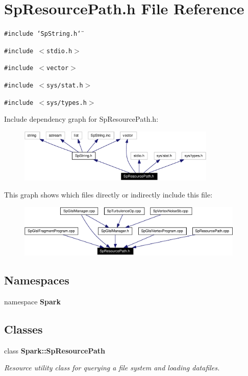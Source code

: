 \section{Sp\-Resource\-Path.h File Reference}
\label{SpResourcePath_8h}
{\tt \#include \char`\"{}Sp\-String.h\char`\"{}}\par
{\tt \#include $<$stdio.h$>$}\par
{\tt \#include $<$vector$>$}\par
{\tt \#include $<$sys/stat.h$>$}\par
{\tt \#include $<$sys/types.h$>$}\par


Include dependency graph for Sp\-Resource\-Path.h:\begin{figure}[H]
\begin{center}
\leavevmode
\includegraphics[width=267pt]{SpResourcePath_8h__incl}
\end{center}
\end{figure}


This graph shows which files directly or indirectly include this file:\begin{figure}[H]
\begin{center}
\leavevmode
\includegraphics[width=306pt]{SpResourcePath_8h__dep__incl}
\end{center}
\end{figure}
\subsection*{Namespaces}
\begin{CompactItemize}
\item 
namespace {\bf Spark}
\end{CompactItemize}
\subsection*{Classes}
\begin{CompactItemize}
\item 
class {\bf Spark::Sp\-Resource\-Path}
\begin{CompactList}\small\item\em Resource utility class for querying a file system and loading datafiles. \item\end{CompactList}\end{CompactItemize}
